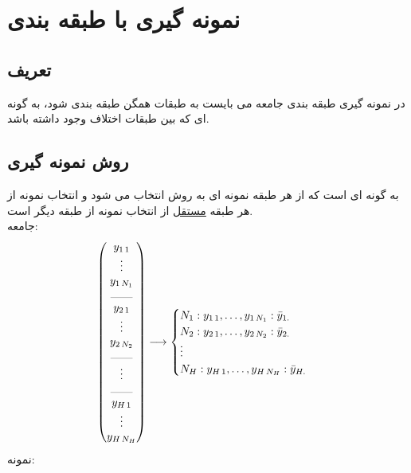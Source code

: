 	\section*{نمونه گیری با طبقه بندی}
\subsection*{تعریف}
در نمونه گیری طبقه بندی جامعه می بایست به طبقات همگن طبقه بندی شود، به گونه ای که بین طبقات اختلاف وجود داشته باشد.
\subsection*{روش نمونه گیری}
به گونه ای است که از هر طبقه نمونه ای به روش 
انتخاب می شود و 
انتخاب نمونه از هر طبقه
\underline{ مستقل}
از انتخاب نمونه از طبقه دیگر است.
\\
جامعه:
\begin{equation*}
	\begin{pmatrix}
		y_{1\,1} \\
		\vdots \\
		y_{1\,N_1} \\
		\rule{0.7cm}{0.2pt} \\
		y_{2\,1} \\
		\vdots \\
		y_{2\,N_2} \\
		\rule{0.7cm}{0.2pt} \\
		\vdots \\
		\rule{0.7cm}{0.2pt} \\
		y_{H\,1} \\
		\vdots \\
		y_{H\,N_H} \\
	\end{pmatrix}
	\longrightarrow 
	\begin{cases}
		N_1:y_{1\, 1},\dots , y_{1\, N_1}:\bar{y}_{1.} \\
		N_2:y_{2\, 1},\dots , y_{2\, N_2}:\bar{y}_{2.} \\
		\vdots \\
		N_H:y_{H\, 1},\dots , y_{H\, N_H}:\bar{y}_{H.} \\
	\end{cases}
\end{equation*}
نمونه:
